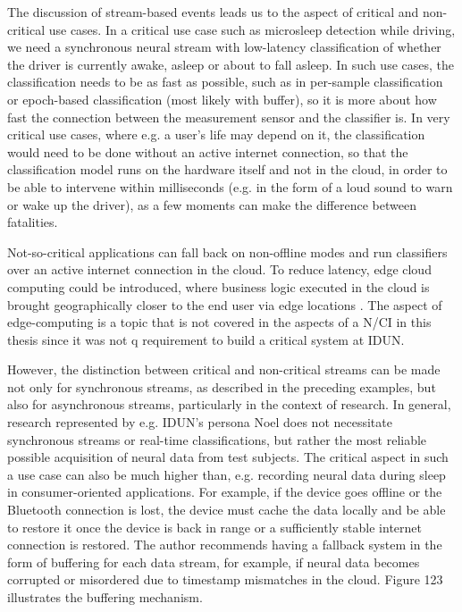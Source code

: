 The discussion of stream-based events leads us to the aspect of critical and non-critical use cases. In a critical use case such as microsleep detection while driving, we need a synchronous neural stream with low-latency classification of whether the driver is currently awake, asleep or about to fall asleep. In such use cases, the classification needs to be as fast as possible, such as in per-sample classification or epoch-based classification (most likely with buffer), so it is more about how fast the connection between the measurement sensor and the classifier is. In very critical use cases, where e.g. a user's life may depend on it, the classification would need to be done without an active internet connection, so that the classification model runs on the hardware itself and not in the cloud, in order to be able to intervene within milliseconds (e.g. in the form of a loud sound to warn or wake up the driver), as a few moments can make the difference between fatalities.

Not-so-critical applications can fall back on non-offline modes and run classifiers over an active internet connection in the cloud. To reduce latency, edge cloud computing could be introduced, where business logic executed in the cloud is brought geographically closer to the end user via edge locations \citep{nomios_what_nodate}. The aspect of edge-computing is a topic that is not covered in the aspects of a N/CI in this thesis since it was not q requirement to build a critical system at IDUN.

However, the distinction between critical and non-critical streams can be made not only for synchronous streams, as described in the preceding examples, but also for asynchronous streams, particularly in the context of research. In general, research represented by e.g. IDUN's persona Noel does not necessitate synchronous streams or real-time classifications, but rather the most reliable possible acquisition of neural data from test subjects. The critical aspect in such a use case can also be much higher than, e.g. recording neural data during sleep in consumer-oriented applications. For example, if the device goes offline or the Bluetooth connection is lost, the device must cache the data locally and be able to restore it once the device is back in range or a sufficiently stable internet connection is restored. The author recommends having a fallback system in the form of buffering for each data stream, for example, if neural data becomes corrupted or misordered due to timestamp mismatches in the cloud. Figure 123 illustrates the buffering mechanism.

